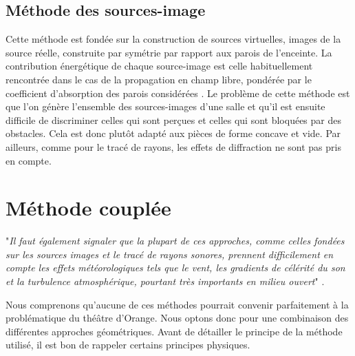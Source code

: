 	\subsection{Méthode des sources-image}
Cette méthode est fondée sur la construction de sources virtuelles, images de la source réelle, construite par symétrie par rapport aux parois de l'enceinte. La contribution énergétique de chaque source-image est celle habituellement rencontrée dans le cas de la propagation en champ libre, pondérée par le coefficient d’absorption des parois considérées \cite[p. 60]{picaut}.
Le problème de cette méthode est que l'on génère l'ensemble des sources-images d'une salle et qu'il est ensuite difficile de discriminer celles qui sont perçues et celles qui sont bloquées par des obstacles. Cela est donc plutôt adapté aux pièces de forme concave et vide. Par ailleurs, comme pour le tracé de rayons, les effets de diffraction ne sont pas pris en compte. 

	
	
\section{Méthode couplée} \label{sect_methodecouplee}

"\textit{Il faut également signaler que la plupart de ces approches, comme celles fondées sur les sources images et le tracé de rayons sonores, prennent difficilement en compte les effets météorologiques tels que le vent, les gradients de célérité du son et la turbulence atmosphérique, pourtant très importants en milieu ouvert}" \cite[p. 60]{picaut}.

Nous comprenons qu'aucune de ces méthodes pourrait convenir parfaitement à la problématique du théâtre d'Orange. Nous optons donc pour une combinaison des différentes approches géométriques. Avant de détailler le principe de la méthode utilisé, il est bon de rappeler certains principes physiques.

